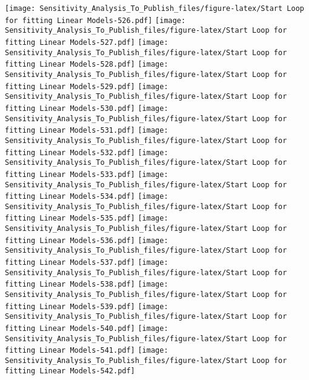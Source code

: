 \documentclass[
]{article}
\begin{document}
\texttt{[image: Sensitivity\_Analysis\_To\_Publish\_files/figure-latex/Start Loop for fitting Linear Models-526.pdf]}
\texttt{[image: Sensitivity\_Analysis\_To\_Publish\_files/figure-latex/Start Loop for fitting Linear Models-527.pdf]}
\texttt{[image: Sensitivity\_Analysis\_To\_Publish\_files/figure-latex/Start Loop for fitting Linear Models-528.pdf]}
\texttt{[image: Sensitivity\_Analysis\_To\_Publish\_files/figure-latex/Start Loop for fitting Linear Models-529.pdf]}
\texttt{[image: Sensitivity\_Analysis\_To\_Publish\_files/figure-latex/Start Loop for fitting Linear Models-530.pdf]}
\texttt{[image: Sensitivity\_Analysis\_To\_Publish\_files/figure-latex/Start Loop for fitting Linear Models-531.pdf]}
\texttt{[image: Sensitivity\_Analysis\_To\_Publish\_files/figure-latex/Start Loop for fitting Linear Models-532.pdf]}
\texttt{[image: Sensitivity\_Analysis\_To\_Publish\_files/figure-latex/Start Loop for fitting Linear Models-533.pdf]}
\texttt{[image: Sensitivity\_Analysis\_To\_Publish\_files/figure-latex/Start Loop for fitting Linear Models-534.pdf]}
\texttt{[image: Sensitivity\_Analysis\_To\_Publish\_files/figure-latex/Start Loop for fitting Linear Models-535.pdf]}
\texttt{[image: Sensitivity\_Analysis\_To\_Publish\_files/figure-latex/Start Loop for fitting Linear Models-536.pdf]}
\texttt{[image: Sensitivity\_Analysis\_To\_Publish\_files/figure-latex/Start Loop for fitting Linear Models-537.pdf]}
\texttt{[image: Sensitivity\_Analysis\_To\_Publish\_files/figure-latex/Start Loop for fitting Linear Models-538.pdf]}
\texttt{[image: Sensitivity\_Analysis\_To\_Publish\_files/figure-latex/Start Loop for fitting Linear Models-539.pdf]}
\texttt{[image: Sensitivity\_Analysis\_To\_Publish\_files/figure-latex/Start Loop for fitting Linear Models-540.pdf]}
\texttt{[image: Sensitivity\_Analysis\_To\_Publish\_files/figure-latex/Start Loop for fitting Linear Models-541.pdf]}
\texttt{[image: Sensitivity\_Analysis\_To\_Publish\_files/figure-latex/Start Loop for fitting Linear Models-542.pdf]}
\end{document}
